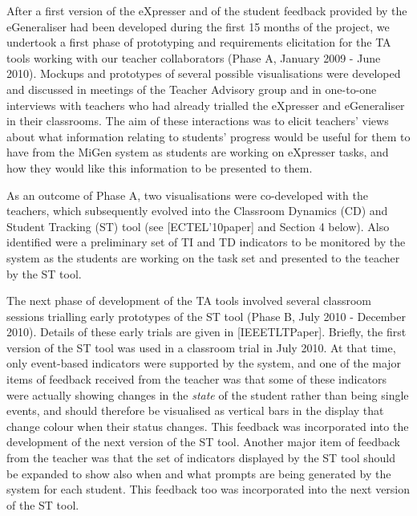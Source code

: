 After a first version of the eXpresser and of the student feedback
provided by the eGeneraliser had been developed during the first 15
months of the project, we undertook a first phase of prototyping and
requirements elicitation for the TA tools working with our teacher
collaborators (Phase A, January 2009 - June 2010). Mockups and
prototypes of several possible visualisations were developed and
discussed in meetings of the Teacher Advisory group and in one-to-one
interviews with teachers who had already trialled the eXpresser and
eGeneraliser in their classrooms. The aim of these interactions was to
elicit teachers’ views about what information relating to students’
progress would be useful for them to have from the MiGen system as
students are working on eXpresser tasks, and how they would like this
information to be presented to them.
  
As an outcome of Phase A, two visualisations were co-developed with
the teachers, which subsequently evolved into the Classroom Dynamics
(CD) and Student Tracking (ST) tool (see [ECTEL’10paper] and Section 4
below). Also identified were a preliminary set of TI and TD indicators
to be monitored by the system as the students are working on the task
set and presented to the teacher by the ST tool.

The next phase of development of the TA tools involved several
classroom sessions trialling early prototypes of the ST tool (Phase B,
July 2010 - December 2010). Details of these early trials are given in
[IEEETLTPaper]. Briefly, the first version of the ST tool was used in
a classroom trial in July 2010. At that time, only event-based
indicators were supported by the system, and one of the major items of
feedback received from the teacher was that some of these indicators
were actually showing changes in the {\em state} of the student rather
than being single events, and should therefore be visualised as
vertical bars in the display that change colour when their status
changes. This feedback was incorporated into the development of the
next version of the ST tool. Another major item of feedback from the
teacher was that the set of indicators displayed by the ST tool should
be expanded to show also when and what prompts are being generated by
the system for each student. This feedback too was incorporated into
the next version of the ST tool.
 
